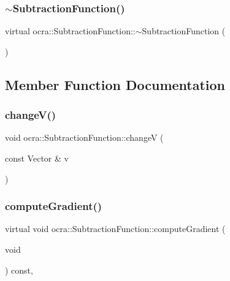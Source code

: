 \hypertarget{classocra_1_1SubtractionFunction_a87e030eb99b05722464881e3bb220027}{}\label{classocra_1_1SubtractionFunction_a87e030eb99b05722464881e3bb220027} 
\subsubsection{\texorpdfstring{$\sim$\+Subtraction\+Function()}{~SubtractionFunction()}}
{\footnotesize\ttfamily virtual ocra\+::\+Subtraction\+Function\+::$\sim$\+Subtraction\+Function (\begin{DoxyParamCaption}{ }\end{DoxyParamCaption})\hspace{0.3cm}{\ttfamily [virtual]}}



\subsection{Member Function Documentation}
\hypertarget{classocra_1_1SubtractionFunction_a00ed4b4afd66bd91dea2f2ebbcd5b615}{}\label{classocra_1_1SubtractionFunction_a00ed4b4afd66bd91dea2f2ebbcd5b615} 
\subsubsection{\texorpdfstring{change\+V()}{changeV()}}
{\footnotesize\ttfamily void ocra\+::\+Subtraction\+Function\+::changeV (\begin{DoxyParamCaption}\item[{const Vector \&}]{v }\end{DoxyParamCaption})}

\hypertarget{classocra_1_1SubtractionFunction_a117739796f68e8cf8e8931606ff09443}{}\label{classocra_1_1SubtractionFunction_a117739796f68e8cf8e8931606ff09443} 
\subsubsection{\texorpdfstring{compute\+Gradient()}{computeGradient()}}
{\footnotesize\ttfamily virtual void ocra\+::\+Subtraction\+Function\+::compute\+Gradient (\begin{DoxyParamCaption}\item[{void}]{ }\end{DoxyParamCaption}) const\hspace{0.3cm}{\ttfamily [protected]}, {\ttfamily [virtual]}}

